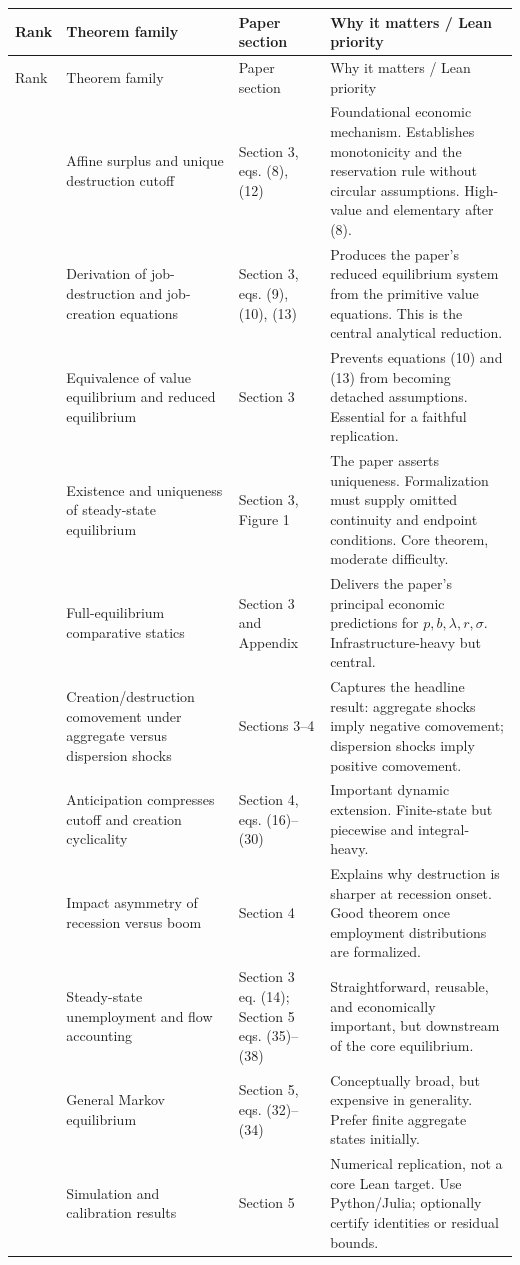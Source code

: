 \documentclass[11pt]{article}
\begin{document}
\begin{longtable}{>{\raggedright\arraybackslash}p{} >{\raggedright\arraybackslash}p{} >{\raggedright\arraybackslash}p{} >{\raggedright\arraybackslash}p{}}
\toprule
Rank & Theorem family & Paper section & Why it matters / Lean priority \\
\midrule
\endfirsthead
\toprule
Rank & Theorem family & Paper section & Why it matters / Lean priority \\
\midrule
\endhead
1 & Affine surplus and unique destruction cutoff & Section 3, eqs. (8), (12) & Foundational economic mechanism. Establishes monotonicity and the reservation rule without circular assumptions. High-value and elementary after (8). \\
2 & Derivation of job-destruction and job-creation equations & Section 3, eqs. (9), (10), (13) & Produces the paper's reduced equilibrium system from the primitive value equations. This is the central analytical reduction. \\
3 & Equivalence of value equilibrium and reduced equilibrium & Section 3 & Prevents equations (10) and (13) from becoming detached assumptions. Essential for a faithful replication. \\
4 & Existence and uniqueness of steady-state equilibrium & Section 3, Figure 1 & The paper asserts uniqueness. Formalization must supply omitted continuity and endpoint conditions. Core theorem, moderate difficulty. \\
5 & Full-equilibrium comparative statics & Section 3 and Appendix & Delivers the paper's principal economic predictions for $p,b,\lambda,r,\sigma$. Infrastructure-heavy but central. \\
6 & Creation/destruction comovement under aggregate versus dispersion shocks & Sections 3--4 & Captures the headline result: aggregate shocks imply negative comovement; dispersion shocks imply positive comovement. \\
7 & Anticipation compresses cutoff and creation cyclicality & Section 4, eqs. (16)--(30) & Important dynamic extension. Finite-state but piecewise and integral-heavy. \\
8 & Impact asymmetry of recession versus boom & Section 4 & Explains why destruction is sharper at recession onset. Good theorem once employment distributions are formalized. \\
9 & Steady-state unemployment and flow accounting & Section 3 eq. (14); Section 5 eqs. (35)--(38) & Straightforward, reusable, and economically important, but downstream of the core equilibrium. \\
10 & General Markov equilibrium & Section 5, eqs. (32)--(34) & Conceptually broad, but expensive in generality. Prefer finite aggregate states initially. \\
11 & Simulation and calibration results & Section 5 & Numerical replication, not a core Lean target. Use Python/Julia; optionally certify identities or residual bounds. \\
\bottomrule
\end{longtable}
\end{document}
